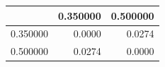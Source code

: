 \begin{tabular}{lrr}
\toprule
 & 0.350000 & 0.500000 \\
\midrule
0.350000 & 0.0000 & 0.0274 \\
0.500000 & 0.0274 & 0.0000 \\
\bottomrule
\end{tabular}
